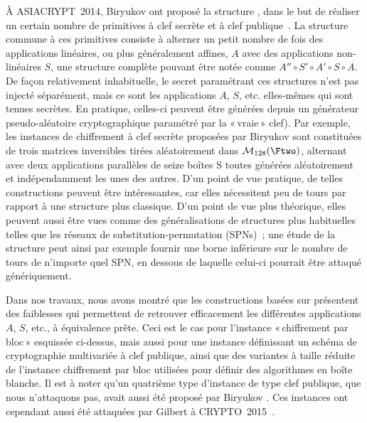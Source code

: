 À ASIACRYPT~2014, Biryukov \etal ont proposé la structure \asasa, dans le but de réaliser un certain nombre de primitives à clef secrète et à clef publique~\cite{DBLP:conf/asiacrypt/BiryukovBK14}.
La structure commune à ces primitives consiste à alterner un petit nombre de fois des applications linéaires, ou plus généralement affines, $A$ avec des applications non-linéaires $S$, une structure
complète pouvant être notée
comme $A'' \circ S' \circ A' \circ S \circ A$. De façon relativement inhabituelle, le secret paramétrant ces structures n'est pas injecté séparément, mais ce sont
les applications $A$, $S$, etc. elles-mêmes qui sont tenues secrètes.
En pratique, celles-ci peuvent être générées depuis un générateur pseudo-aléatoire cryptographique paramétré par la «\,vraie\,»
clef). Par exemple, les instances \asasa de chiffrement à clef secrète proposées par Biryukov \etal sont constituées de
trois matrices inversibles tirées aléatoirement dans $\mathcal{M}_{128}(\Ftwo)$,
alternant avec deux applications parallèles de seize boîtes S toutes générées aléatoirement et indépendamment les unes des autres.
D'un point de vue pratique, de telles constructions peuvent être intéressantes, car elles nécessitent peu de tours par rapport à une structure plus classique. D'un point de vue plus théorique, elles peuvent
aussi être vues comme des généralisations de structures plus habituelles telles que les réseaux de substitution-permutation (SPNs)~; une étude de la structure \asasa peut ainsi par exemple fournir une borne inférieure sur le nombre de tours
de n'importe quel SPN, en dessous de laquelle celui-ci pourrait être attaqué génériquement.

Dans nos travaux, nous avons montré que les constructions basées sur \asasa présentent des faiblesses qui permettent de retrouver efficacement les différentes applications $A$, $S$, etc., à équivalence prête. Ceci est le cas pour l'instance «\,chiffrement par bloc\,» esquissée ci-dessus, mais aussi pour une instance définissant un schéma de cryptographie multivariée
à clef publique, ainsi que des variantes à taille réduite de l'instance chiffrement par bloc utilisées pour définir des algorithmes en boîte blanche.
Il est à noter qu'un quatrième type d'instance de type clef publique, que nous n'attaquons pas, avait aussi été proposé par Biryukov \etal. Ces instances ont cependant aussi été attaquées par
Gilbert \etal à CRYPTO~2015~\cite{DBLP:conf/crypto/GilbertPT15}.

